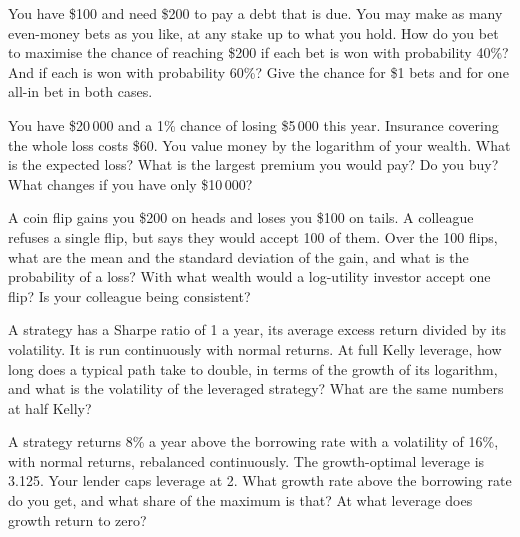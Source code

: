 \begin{question}\label{iq:iv2:betting-and-kelly:19}
You have \$100 and need \$200 to pay a debt that is due. You may make as many even-money bets as you like, at any stake up to what you hold. How do you bet to maximise the chance of reaching \$200 if each bet is won with probability 40\%? And if each is won with probability 60\%? Give the chance for \$1 bets and for one all-in bet in both cases.
\end{question}

\begin{question}\label{iq:iv2:betting-and-kelly:20}
You have \$20\,000 and a 1\% chance of losing \$5\,000 this year. Insurance covering the whole loss costs \$60. You value money by the logarithm of your wealth. What is the expected loss? What is the largest premium you would pay? Do you buy? What changes if you have only \$10\,000?
\end{question}

\begin{question}\label{iq:iv2:betting-and-kelly:21}
A coin flip gains you \$200 on heads and loses you \$100 on tails. A colleague refuses a single flip, but says they would accept 100 of them. Over the 100 flips, what are the mean and the standard deviation of the gain, and what is the probability of a loss? With what wealth would a log-utility investor accept one flip? Is your colleague being consistent?
\end{question}

\begin{question}\label{iq:iv2:betting-and-kelly:22}
A strategy has a Sharpe ratio of 1 a year, its average excess return divided by its volatility. It is run continuously with normal returns. At full Kelly leverage, how long does a typical path take to double, in terms of the growth of its logarithm, and what is the volatility of the leveraged strategy? What are the same numbers at half Kelly?
\end{question}

\begin{question}\label{iq:iv2:betting-and-kelly:23}
A strategy returns 8\% a year above the borrowing rate with a volatility of 16\%, with normal returns, rebalanced continuously. The growth-optimal leverage is 3.125. Your lender caps leverage at 2. What growth rate above the borrowing rate do you get, and what share of the maximum is that? At what leverage does growth return to zero?
\end{question}

